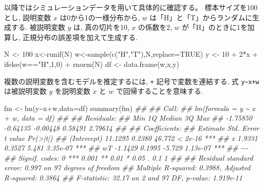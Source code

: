\documentclass[
  letterpaper,
  xelatex,
  ja=standard, xelatex]{bxjsbook}
\newenvironment{Shaded}{\begin{snugshade}}{\end{snugshade}}
\newcommand{\AttributeTok}[1]{\textcolor[rgb]{0.40,0.45,0.13}{#1}}
\newcommand{\ConstantTok}[1]{\textcolor[rgb]{0.56,0.35,0.01}{#1}}
\newcommand{\DecValTok}[1]{\textcolor[rgb]{0.68,0.00,0.00}{#1}}
\newcommand{\DocumentationTok}[1]{\textcolor[rgb]{0.37,0.37,0.37}{\textit{#1}}}
\newcommand{\FunctionTok}[1]{\textcolor[rgb]{0.28,0.35,0.67}{#1}}
\newcommand{\NormalTok}[1]{\textcolor[rgb]{0.00,0.23,0.31}{#1}}
\newcommand{\OtherTok}[1]{\textcolor[rgb]{0.00,0.23,0.31}{#1}}
\newcommand{\SpecialCharTok}[1]{\textcolor[rgb]{0.37,0.37,0.37}{#1}}
\newcommand{\StringTok}[1]{\textcolor[rgb]{0.13,0.47,0.30}{#1}}
\begin{document}
以降ではシミュレーションデータを用いて具体的に確認する。
標本サイズを100とし, 説明変数 \(x\) は0から1の一様分布から, \(w\)
は「H」と「T」からランダムに生成する. 被説明変数 \(y\) は, 真の切片を10,
\(x\) の係数を2, \(w\) が「H」のときに1を加算し,
正規分布の誤差項を加えて生成する.

\begin{Shaded}
\begin{Highlighting}[]
\NormalTok{N }\OtherTok{\textless{}{-}} \DecValTok{100}
\NormalTok{x}\OtherTok{\textless{}{-}}\FunctionTok{runif}\NormalTok{(N)}
\NormalTok{w}\OtherTok{\textless{}{-}}\FunctionTok{sample}\NormalTok{(}\FunctionTok{c}\NormalTok{(}\StringTok{"H"}\NormalTok{,}\StringTok{"T"}\NormalTok{),N,}\AttributeTok{replace=}\ConstantTok{TRUE}\NormalTok{)}
\NormalTok{y }\OtherTok{\textless{}{-}} \DecValTok{10} \SpecialCharTok{+} \DecValTok{2}\SpecialCharTok{*}\NormalTok{x }\SpecialCharTok{+} \FunctionTok{ifelse}\NormalTok{(w}\SpecialCharTok{==}\StringTok{"H"}\NormalTok{,}\DecValTok{1}\NormalTok{,}\DecValTok{0}\NormalTok{) }\SpecialCharTok{+} \FunctionTok{rnorm}\NormalTok{(N)}
\NormalTok{df }\OtherTok{\textless{}{-}} \FunctionTok{data.frame}\NormalTok{(w,x,y)}
\end{Highlighting}
\end{Shaded}

複数の説明変数を含むモデルを推定するには, \texttt{+}
記号で変数を連結する. 式 \texttt{y\textasciitilde{}x+w} は被説明変数
\(y\) を説明変数 \(x\) と \(w\) で回帰することを意味する.

\begin{Shaded}
\begin{Highlighting}[]
\NormalTok{fm }\OtherTok{\textless{}{-}} \FunctionTok{lm}\NormalTok{(y}\SpecialCharTok{\textasciitilde{}}\NormalTok{x}\SpecialCharTok{+}\NormalTok{w,}\AttributeTok{data=}\NormalTok{df)}
\FunctionTok{summary}\NormalTok{(fm)}
\DocumentationTok{\#\# }
\DocumentationTok{\#\# Call:}
\DocumentationTok{\#\# lm(formula = y \textasciitilde{} x + w, data = df)}
\DocumentationTok{\#\# }
\DocumentationTok{\#\# Residuals:}
\DocumentationTok{\#\#      Min       1Q   Median       3Q      Max }
\DocumentationTok{\#\# {-}1.75850 {-}0.64135 {-}0.00448  0.58491  2.79614 }
\DocumentationTok{\#\# }
\DocumentationTok{\#\# Coefficients:}
\DocumentationTok{\#\#             Estimate Std. Error t value Pr(\textgreater{}|t|)    }
\DocumentationTok{\#\# (Intercept)  11.1295     0.2380  46.772  \textless{} 2e{-}16 ***}
\DocumentationTok{\#\# x             1.9331     0.3527   5.481 3.35e{-}07 ***}
\DocumentationTok{\#\# wT           {-}1.1429     0.1995  {-}5.729 1.13e{-}07 ***}
\DocumentationTok{\#\# {-}{-}{-}}
\DocumentationTok{\#\# Signif. codes:  0 \textquotesingle{}***\textquotesingle{} 0.001 \textquotesingle{}**\textquotesingle{} 0.01 \textquotesingle{}*\textquotesingle{} 0.05 \textquotesingle{}.\textquotesingle{} 0.1 \textquotesingle{} \textquotesingle{} 1}
\DocumentationTok{\#\# }
\DocumentationTok{\#\# Residual standard error: 0.997 on 97 degrees of freedom}
\DocumentationTok{\#\# Multiple R{-}squared:  0.3988, Adjusted R{-}squared:  0.3864 }
\DocumentationTok{\#\# F{-}statistic: 32.17 on 2 and 97 DF,  p{-}value: 1.919e{-}11}
\end{Highlighting}
\end{Shaded}
\end{document}
